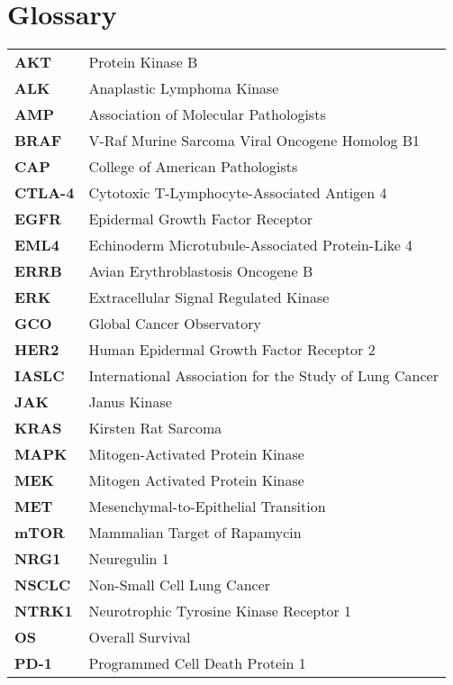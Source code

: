 \chapter*{Glossary}

\footnotesize
\begin{longtable}[l]{l l}
    \textbf{AKT} & Protein Kinase B \\ 
    \textbf{ALK} & Anaplastic Lymphoma Kinase \\
    \textbf{AMP} & Association of Molecular Pathologists \\
    \textbf{BRAF} & V-Raf Murine Sarcoma Viral Oncogene Homolog B1 \\
    \textbf{CAP} & College of American Pathologists \\
    \textbf{CTLA-4} & Cytotoxic T-Lymphocyte-Associated Antigen 4 \\
    \textbf{EGFR} & Epidermal Growth Factor Receptor \\
    \textbf{EML4} & Echinoderm Microtubule-Associated Protein-Like 4 \\
    \textbf{ERRB} & Avian Erythroblastosis Oncogene B \\
    \textbf{ERK} & Extracellular Signal Regulated Kinase \\
    \textbf{GCO} & Global Cancer Observatory \\
    \textbf{HER2} & Human Epidermal Growth Factor Receptor 2 \\
    \textbf{IASLC} & International Association for the Study of Lung Cancer \\
    \textbf{JAK} & Janus Kinase \\
    \textbf{KRAS} & Kirsten Rat Sarcoma \\
    \textbf{MAPK} & Mitogen-Activated Protein Kinase \\
    \textbf{MEK} & Mitogen Activated Protein Kinase \\
    \textbf{MET} & Mesenchymal-to-Epithelial Transition \\
    \textbf{mTOR} & Mammalian Target of Rapamycin \\
    \textbf{NRG1} & Neuregulin 1 \\
    \textbf{NSCLC} & Non-Small Cell Lung Cancer \\
    \textbf{NTRK1} & Neurotrophic Tyrosine Kinase Receptor 1 \\
    \textbf{OS} & Overall Survival \\
    \textbf{PD-1} & Programmed Cell Death Protein 1 \\

\end{longtable}

